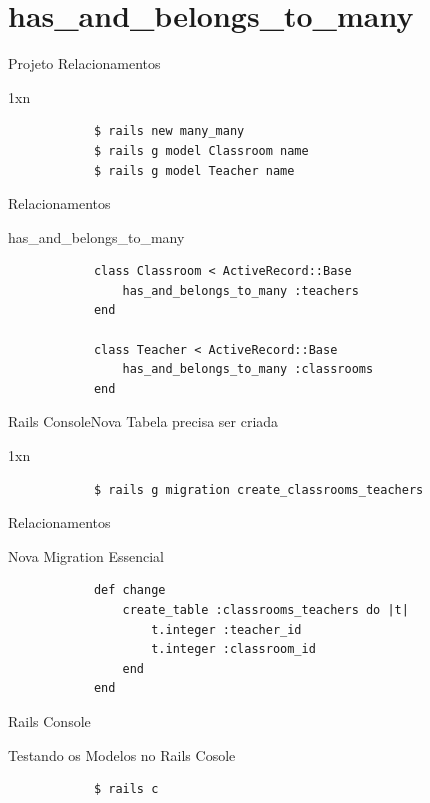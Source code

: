 \documentclass{beamer}
\begin{document}
\section{has\_and\_belongs\_to\_many}

\begin{frame}[fragile]{Projeto Relacionamentos}
	\begin{block} {1xn}
		\begin{verbatim}
		  	$ rails new many_many
		  	$ rails g model Classroom name 
		  	$ rails g model Teacher name
		\end{verbatim}
	\end{block}
\end{frame}

\begin{frame}[fragile]{Relacionamentos}
	\begin{block} {\LARGE has\_and\_belongs\_to\_many}
		\begin{verbatim}
		  	class Classroom < ActiveRecord::Base
		  	    has_and_belongs_to_many :teachers
		  	end
		  	
		  	class Teacher < ActiveRecord::Base
		  	    has_and_belongs_to_many :classrooms
		  	end
		\end{verbatim}
	\end{block}
\end{frame}

\begin{frame}[fragile]{Rails Console}{Nova Tabela precisa ser criada}
	\begin{block} {1xn}
		\begin{verbatim}
		  	$ rails g migration create_classrooms_teachers
		\end{verbatim}
	\end{block}
\end{frame}

\begin{frame}[fragile]{Relacionamentos}
	\begin{block} {\LARGE Nova Migration Essencial}
		\begin{verbatim}
		    def change
		        create_table :classrooms_teachers do |t|
		            t.integer :teacher_id
		            t.integer :classroom_id			
		        end
		    end
		\end{verbatim}
	\end{block}
\end{frame}

\begin{frame}[fragile]{Rails Console}
	\begin{block} {\LARGE Testando os Modelos no Rails Cosole}
		\begin{verbatim}
			$ rails c
		\end{verbatim}
	\end{block}
\end{frame}
\end{document}
